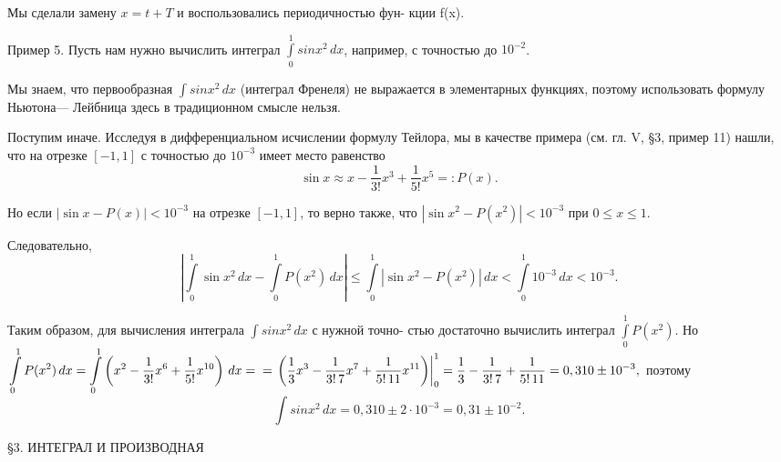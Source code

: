 \documentclass[a4paper, 10pt]{book}
\begin{document}
    \par
    Мы сделали замену $x = t + T$ и воспользовались периодичностью фун-
    кции f(x).
    \par
    Пример 5. Пусть нам нужно вычислить интеграл $\int\limits_{0}^{1} sin{x^2} \,dx$, например, с точностью до $10^{-2}$.
    \par
    Мы знаем, что первообразная $\int sin{x^2} \,dx$ (интеграл Френеля) не выражается в элементарных функциях, поэтому использовать формулу Ньютона—
    Лейбница здесь в традиционном смысле нельзя.
    \par
    Поступим иначе. Исследуя в дифференциальном исчислении формулу Тейлора, 
    мы в качестве примера (см. гл. V, \S 3, пример 11) нашли, 
    что на отрезке $[-1, 1]$ с точностью до $10^{-3}$ имеет место равенство
    \[
    \sin{x} \approx x - \frac{1}{3!}x^{3} + \frac{1}{5!}x^{5}=:P(x).
    \]
    \par
    Но если $|\sin{x} - P(x)| < 10^{-3}$ на отрезке $[-1, 1]$, то верно также, что $|\sin{x^2} - P(x^2)| < 10^{-3}$ при $0 \leq x \leq 1$.
    \par
    Следовательно,
    \[
    \left|
    \int\limits_{0}^{1} \sin{x^2} \,dx - \int\limits_{0}^{1} P(x^2) \,dx
    \right| \leq \int\limits_{0}^{1} \left| \sin{x^2} - P(x^2) \right| \,dx <
    \int\limits_{0}^{1} 10^{-3} \,dx < 10^{-3}.
    \]
    \par
    Таким образом, для вычисления интеграла $\int sin{x^2} \,dx$ с нужной точно-
    стью достаточно вычислить интеграл $\int\limits_{0}^{1} P(x^2)$. Но
    \newline
    $
    \displaystyle
    \int\limits_{0}^{1} P(x^{2}) \,dx = \int\limits_{0}^{1} \left(
    x^{2} - \frac{1}{3!}x^{6} + \frac{1}{5!}x^{10} \right) \,dx =
    \\
    \null\hfill
    =\left.\left(
    \frac{1}{3}x^{3} - \frac{1}{3! \, 7}x^{7} + \frac{1}{5! \, 11}x^{11} \right)\right|_{0}^{1} =
    \frac{1}{3} - \frac{1}{3! \, 7} + \frac{1}{5! \, 11} =
    0,310 \pm 10^{-3},
    $
    \newline
    поэтому
    \[
    \int sin{x^2} \,dx = 0,310 \pm 2\cdot10^{-3} = 0,31\pm10^{-2}.
    \]

    \newpage

    \begin{center}
        \S3. ИНТЕГРАЛ И ПРОИЗВОДНАЯ
    \end{center}
\end{document}
